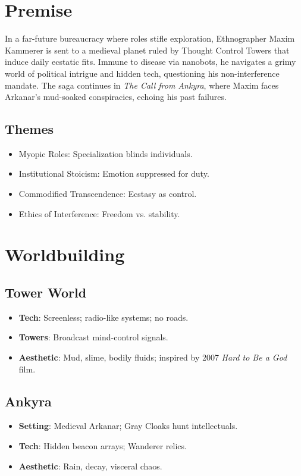 \documentclass[10pt,letterpaper]{article}
\begin{document}
\begin{paracol}{2}
\section{Premise}
In a far-future bureaucracy where roles stifle exploration, Ethnographer Maxim Kammerer is sent to a medieval planet ruled by Thought Control Towers that induce daily ecstatic fits. Immune to disease via nanobots, he navigates a grimy world of political intrigue and hidden tech, questioning his non-interference mandate. The saga continues in \textit{The Call from Ankyra}, where Maxim faces Arkanar's mud-soaked conspiracies, echoing his past failures.

\subsection{Themes}
\begin{itemize}
    \item Myopic Roles: Specialization blinds individuals.
    \item Institutional Stoicism: Emotion suppressed for duty.
    \item Commodified Transcendence: Ecstasy as control.
    \item Ethics of Interference: Freedom vs. stability.
\end{itemize}

\section{Worldbuilding}
\subsection{Tower World}
\begin{itemize}
    \item \textbf{Tech}: Screenless; radio-like systems; no roads.
    \item \textbf{Towers}: Broadcast mind-control signals.
    \item \textbf{Aesthetic}: Mud, slime, bodily fluids; inspired by 2007 \textit{Hard to Be a God} film.
\end{itemize}
\subsection{Ankyra}
\begin{itemize}
    \item \textbf{Setting}: Medieval Arkanar; Gray Cloaks hunt intellectuals.
    \item \textbf{Tech}: Hidden beacon arrays; Wanderer relics.
    \item \textbf{Aesthetic}: Rain, decay, visceral chaos.
\end{itemize}

\end{paracol}
\end{document}
